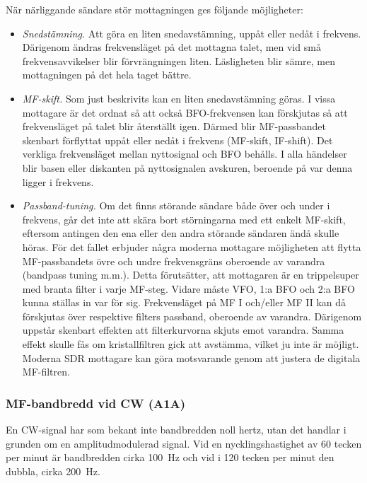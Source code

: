 När närliggande sändare stör mottagningen ges följande möjligheter:
\begin{itemize}
\item \emph{Snedstämning.}
  Att göra en liten snedavstämning, uppåt eller nedåt i frekvens.
  Därigenom ändras frekvensläget på det mottagna talet, men vid små
  frekvensavvikelser blir förvrängningen liten.
  Läsligheten blir sämre, men mottagningen på det hela taget bättre.

\item \emph{MF-skift.}
  Som just beskrivits kan en liten snedavstämning göras.
  I vissa mottagare är det ordnat så att också BFO-frekvensen kan förskjutas
  så att frekvensläget på talet blir återställt igen.
  Därmed blir MF-passbandet skenbart förflyttat uppåt eller nedåt i frekvens
  (MF-skift, IF-shift).
  Det verkliga frekvensläget mellan nyttosignal och BFO behålls.
  I alla händelser blir basen eller diskanten på nyttosignalen avskuren,
  beroende på var denna ligger i frekvens.

\item \emph{Passband-tuning.}
  Om det finns störande sändare både över och under i frekvens, går det inte
  att skära bort störningarna med ett enkelt MF-skift, eftersom antingen den
  ena eller den andra störande sändaren ändå skulle höras.
  För det fallet erbjuder några moderna mottagare möjligheten att flytta
  MF-passbandets övre och undre frekvensgräns oberoende av varandra (bandpass
  tuning m.m.).
  Detta förutsätter, att mottagaren är en trippelsuper med branta filter i
  varje MF-steg.
  Vidare måste VFO, 1:a BFO och 2:a BFO kunna ställas in var för sig.
  Frekvensläget på MF I och/eller MF II kan då förskjutas över respektive
  filters passband, oberoende av varandra.
  Därigenom uppstår skenbart effekten att filterkurvorna skjuts emot varandra.
  Samma effekt skulle fås om kristallfiltren gick att avstämma, vilket ju inte
  är möjligt.
  Moderna SDR mottagare kan göra motsvarande genom att justera de digitala
  MF-filtren.
\end{itemize}

\subsubsection{MF-bandbredd vid CW (A1A)}

En CW-signal har som bekant inte bandbredden noll hertz, utan det handlar i
grunden om en amplitudmodulerad signal.
Vid en nycklingshastighet av 60 tecken per minut är bandbredden cirka
\SI{100}{\hertz} och vid i 120 tecken per minut den dubbla, cirka
\SI{200}{\hertz}.

